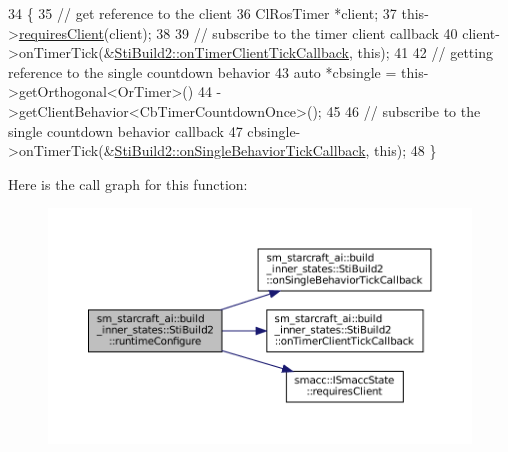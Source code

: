 \begin{DoxyCode}
34   \{
35     \textcolor{comment}{// get reference to the client}
36     ClRosTimer *client;
37     this->\hyperlink{classsmacc_1_1ISmaccState_a7f95c9f0a6ea2d6f18d1aec0519de4ac}{requiresClient}(client);
38 
39     \textcolor{comment}{// subscribe to the timer client callback}
40     client->onTimerTick(&\hyperlink{structsm__starcraft__ai_1_1build__inner__states_1_1StiBuild2_af8ce2f1ad0fafe8a93d9545e312c7710}{StiBuild2::onTimerClientTickCallback}, \textcolor{keyword}{this});
41 
42     \textcolor{comment}{// getting reference to the single countdown behavior}
43     \textcolor{keyword}{auto} *cbsingle = this->getOrthogonal<OrTimer>()
44                          ->getClientBehavior<CbTimerCountdownOnce>();
45 
46     \textcolor{comment}{// subscribe to the single countdown behavior callback}
47     cbsingle->onTimerTick(&\hyperlink{structsm__starcraft__ai_1_1build__inner__states_1_1StiBuild2_abd5fb7f89d975b5c15810cba5df7acb5}{StiBuild2::onSingleBehaviorTickCallback}, \textcolor{keyword}{
      this});
48   \}
\end{DoxyCode}
Here is the call graph for this function\+:
\nopagebreak
\begin{figure}[H]
\begin{center}
\leavevmode
\includegraphics[width=350pt]{structsm__starcraft__ai_1_1build__inner__states_1_1StiBuild2_a69f6a051fbfd9476762b804fbb06809a_cgraph}
\end{center}
\end{figure}
\mbox{\label{structsm__starcraft__ai_1_1build__inner__states_1_1StiBuild2_a811f387766855eeba5679d7943ccdee1}} 
